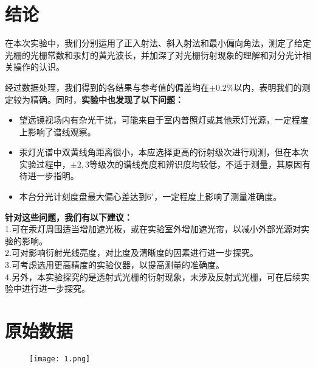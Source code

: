 \documentclass{ctexart}
\begin{document}
\section{结论}

在本次实验中，我们分别运用了正入射法、斜入射法和最小偏向角法，测定了给定光栅的光栅常数和汞灯的黄光波长，并加深了对光栅衍射现象的理解和对分光计相关操作的认识。

经过数据处理，我们得到的各结果与参考值的偏差均在$\pm0.2\%$以内，表明我们的测定较为精确。同时，\textbf{实验中也发现了以下问题：}
\begin{itemize}
  \item 望远镜视场内有杂光干扰，可能来自于室内普照灯或其他汞灯光源，一定程度上影响了谱线观察。
  \item 汞灯光谱中双黄线角距离很小，本应选择更高的衍射级次进行观测，但在本次实验过程中，$\pm2,3$等级次的谱线亮度和辨识度均较低，不适于测量，其原因有待进一步指明。
  \item 本台分光计刻度盘最大偏心差达到$6'$，一定程度上影响了测量准确度。
\end{itemize}

\noindent \textbf{针对这些问题，我们有以下建议：}\\
\noindent 1.可在汞灯周围适当增加遮光板，或在实验室外增加遮光帘，以减小外部光源对实验的影响。\\
\noindent 2.可对影响衍射光线亮度，对比度及清晰度的因素进行进一步探究。\\
\noindent 3.可考虑选用更高精度的实验仪器，以提高测量的准确度。\\
\noindent 4.另外，本实验探究的是透射式光栅的衍射现象，未涉及反射式光栅，可在后续实验中进行进一步探究。


\section{原始数据}

\begin{figure}[h]
  \centering                                          
  \texttt{[image: 1.png]}
  \end{figure}
\end{document}
